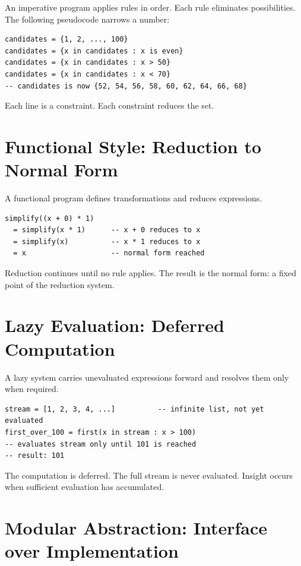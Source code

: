 \documentclass[11pt]{book}
\theoremstyle{plain}
\theoremstyle{definition}
\theoremstyle{remark}
\begin{document}
An imperative program applies rules in order. Each rule eliminates
possibilities. The following pseudocode narrows a number:

\begin{verbatim}
candidates = {1, 2, ..., 100}
candidates = {x in candidates : x is even}
candidates = {x in candidates : x > 50}
candidates = {x in candidates : x < 70}
-- candidates is now {52, 54, 56, 58, 60, 62, 64, 66, 68}
\end{verbatim}

Each line is a constraint. Each constraint reduces the set.

\section*{Functional Style: Reduction to Normal Form}

A functional program defines transformations and reduces expressions.

\begin{verbatim}
simplify((x + 0) * 1)
  = simplify(x * 1)      -- x + 0 reduces to x
  = simplify(x)          -- x * 1 reduces to x
  = x                    -- normal form reached
\end{verbatim}

Reduction continues until no rule applies. The result is the normal
form: a fixed point of the reduction system.

\section*{Lazy Evaluation: Deferred Computation}

A lazy system carries unevaluated expressions forward and resolves
them only when required.

\begin{verbatim}
stream = [1, 2, 3, 4, ...]          -- infinite list, not yet evaluated
first_over_100 = first(x in stream : x > 100)
-- evaluates stream only until 101 is reached
-- result: 101
\end{verbatim}

The computation is deferred. The full stream is never evaluated.
Insight occurs when sufficient evaluation has accumulated.

\section*{Modular Abstraction: Interface over Implementation}
\end{document}
